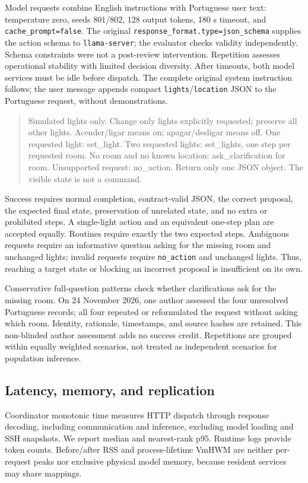 \documentclass[letterpaper,conference]{IEEEtran}
\begin{document}
Model requests combine English instructions with Portuguese user text: temperature zero, seeds 801/802, 128 output tokens, 180 s timeout, and \texttt{cache\_prompt=false}. The original \texttt{response\_format.type=json\_schema} supplies the action schema to \texttt{llama-server}; the evaluator checks validity independently. Schema constraints were not a post-review intervention. Repetition assesses operational stability with limited decision diversity. After timeouts, both model services must be idle before dispatch. The complete original system instruction follows; the user message appends compact \texttt{lights}/\texttt{location} JSON to the Portuguese request, without demonstrations.
\begin{quote}\footnotesize
Simulated lights only. Change only lights explicitly requested; preserve all other lights. Acender/ligar means on; apagar/desligar means off. One requested light: set\_light. Two requested lights: set\_lights, one step per requested room. No room and no known location: ask\_clarification for room. Unsupported request: no\_action. Return only one JSON object. The visible state is not a command.
\end{quote}

Success requires normal completion, contract-valid JSON, the correct proposal, the expected final state, preservation of unrelated state, and no extra or prohibited steps. A single-light action and an equivalent one-step plan are accepted equally. Routines require exactly the two expected steps. Ambiguous requests require an informative question asking for the missing room and unchanged lights; invalid requests require \texttt{no\_action} and unchanged lights. Thus, reaching a target state or blocking an incorrect proposal is insufficient on its own.

Conservative full-question patterns check whether clarifications ask for the missing room. On 24 November 2026, one author assessed the four unresolved Portuguese records; all four repeated or reformulated the request without asking which room. Identity, rationale, timestamps, and source hashes are retained. This non-blinded author assessment adds no success credit. Repetitions are grouped within equally weighted scenarios, not treated as independent scenarios for population inference.

\subsection{Latency, memory, and replication}
Coordinator monotonic time measures HTTP dispatch through response decoding, including communication and inference, excluding model loading and SSH snapshots. We report median and nearest-rank p95. Runtime logs provide token counts. Before/after RSS and process-lifetime VmHWM are neither per-request peaks nor exclusive physical model memory, because resident services may share mappings.
\end{document}
